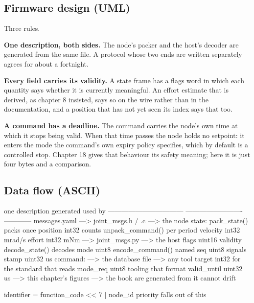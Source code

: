 \subsection*{Firmware design (UML)}


Three rules.

\textbf{One description, both sides.} The node's packer and the host's decoder
are generated from the same file. A protocol whose two ends are written
separately agrees for about a fortnight.

\textbf{Every field carries its validity.} A state frame has a flags word in
which each quantity says whether it is currently meaningful. An effort estimate
that is derived, as chapter 8 insisted, says so on the wire rather than in the
documentation, and a position that has not yet seen its index says that too.

\textbf{A command has a deadline.} The command carries the node's own time at
which it stops being valid. When that time passes the node holds no setpoint: it
enters the mode the command's own expiry policy specifies, which by default is a
controlled stop. Chapter 18 gives that behaviour its safety meaning; here it is
just four bytes and a comparison.

\subsection*{Data flow (ASCII)}

\begin{asciiart}
  one description                     generated                     used by
  ---------------------------------   -------------------------     ------------
  messages.yaml                  ---> joint_msgs.h / .c         ---> the node
    state:                              pack_state()                 packs once
      position  int32  counts           unpack_command()             per period
      velocity  int32  mrad/s
      effort    int32  mNm          ---> joint_msgs.py            ---> the host
      flags     uint16 validity           decode_state()               decodes
      mode      uint8                     encode_command()             named
      seq       uint8                                                  signals
      stamp     uint32 us
    command:                       ---> the database file        ---> any tool
      target    int32                     for the standard              that reads
      mode_req  uint8                     tooling                       that format
      valid_until uint32 us
                                   ---> this chapter's figures   ---> the book
                                         are generated from it         cannot drift

  identifier = function_code << 7 | node_id     priority falls out of this
\end{asciiart}

